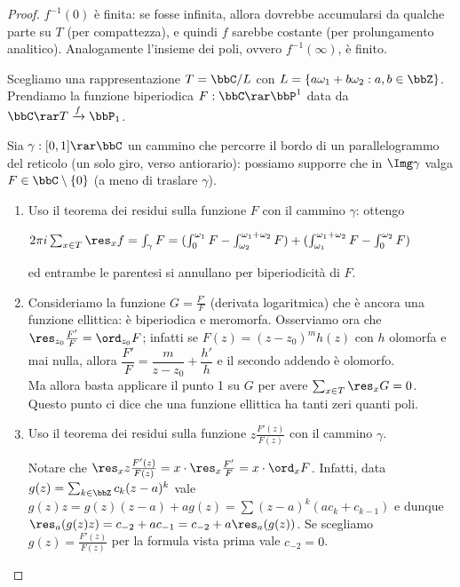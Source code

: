 
\begin{proof}
$f^{-1}(0)$ è finita: se fosse infinita, allora dovrebbe accumularsi da qualche parte su $T$ (per compattezza), e quindi $f$ sarebbe costante (per prolungamento analitico).
Analogamente l'insieme dei poli, ovvero $f^{-1}(\infty)$, è finito.

Scegliamo una rappresentazione $T=\bbC/L$ con $L=\{a\omega_1+b\omega_2 : a,b\in\bbZ\}$. Prendiamo la funzione biperiodica $F:\bbC\rar\bbP^1$ data da $\bbC\rar T\xrightarrow{f}\bbP_1$.

Sia $\gamma:[0,1]\rar\bbC$ un cammino che percorre il bordo di un parallelogrammo del reticolo (un solo giro, verso antiorario):
possiamo supporre che in $\Img\gamma$ valga $F\in\bbC\setminus\{0\}$ (a meno di traslare $\gamma$).

\begin{enumerate}
    \item Uso il teorema dei residui sulla funzione $F$ con il cammino $\gamma$: ottengo

    $2\pi i\sum_{x\in T}\res_xf=\int_\gamma F=(\int_0^{\omega_1}F-\int_{\omega_2}^{\omega_1+\omega_2}F)+(\int_{\omega_1}^{\omega_1+\omega_2}F-\int_{0}^{\omega_2}F)$

    ed entrambe le parentesi si annullano per biperiodicità di $F$.


    \item Consideriamo la funzione $G=\frac{F'}{F}$ (derivata logaritmica) che è ancora una funzione ellittica: è biperiodica e meromorfa. Osserviamo ora che $\res_{z_0}\frac{F'}{F}=\ord_{z_0}F$; infatti se $F(z)=(z-z_0)^mh(z)$ con $h$ olomorfa e mai nulla, allora $\dfrac{F'}{F}=\dfrac{m}{z-z_0}+\dfrac{h'}{h}$ e il secondo addendo è olomorfo.\\
    Ma allora basta applicare il punto 1 su $G$ per avere $\sum_{x\in T}\res_x G=0$.\\
    Questo punto ci dice che una funzione ellittica ha tanti zeri quanti poli.

    \item Uso il teorema dei residui sulla funzione $z\frac{F'(z)}{F(z)}$ con il cammino $\gamma$.

    Notare che $\res_xz\frac{F'(z)}{F(z)}=x\cdot\res_x\frac{F'}{F}=x\cdot\ord_xF$.
    Infatti, data $g(z) = \sum_{k \in \bbZ} c_k (z - a)^k$ vale $g(z)z=g(z)(z-a)+ag(z)=\sum (z-a)^k(ac_k+c_{k-1})$ e dunque $\res_a (g(z)z) = c_{-2} + a c_{-1} = c_{-2} + a\res_a(g(z))$.
    Se scegliamo $g(z) = \frac{F'(z)}{F(z)}$ per la formula vista prima vale $c_{-2} = 0$.


\end{enumerate}
\end{proof}
